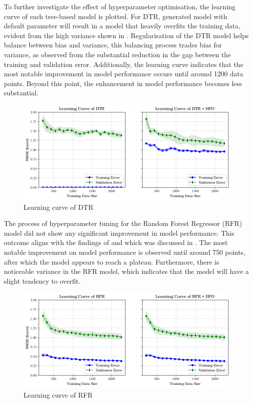 To further investigate the effect of hyperparameter optimisation, the learning curve of each tree-based model is plotted. For DTR, generated model with default parameter will result in a model that heavily overfits the training data, evident from the high variance shown in . Regularisation of the DTR model helps balance between bias and variance, this balancing process trades bias for variance, as observed from the substantial reduction in the gap between the training and validation error. Additionally, the learning curve indicates that the most notable improvement in model performance occurs until around 1200 data points. Beyond this point, the enhancement in model performance becomes less substantial.\\

\begin{figure}[h]
    \centering
        \includegraphics[width=.95\textwidth]{02_figures/learning_curve_dtr.png}
        \caption{Learning curve of DTR}
        \label{fig:learn_curve_DTR_RMSE}
\end{figure}

The process of hyperparameter tuning for the Random Forest Regressor (RFR) model did not show any significant improvement in model performance. This outcome aligns with the findings of   and  which was discussed in . The most notable improvement on model performance is observed until around 750 points, after which the model appears to reach a plateau. Furthermore, there is noticeable variance in the RFR model, which indicates that the model will have a slight tendency to overfit.

\begin{figure}[h]
    \centering
        \includegraphics[width=.95\textwidth]{02_figures/learning_curve_rfr_rmse.png}
        \caption{Learning curve of RFR}
        \label{fig:learn_curve_RFR_RMSE}
\end{figure}


